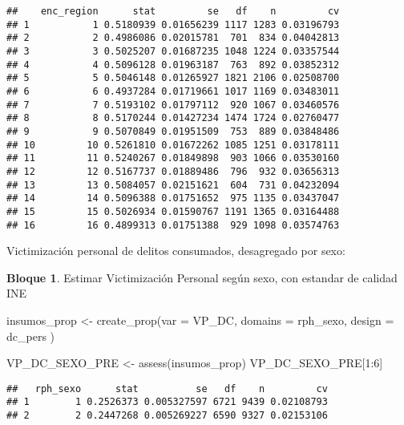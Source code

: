\documentclass[
]{book}
\newenvironment{Shaded}{\begin{snugshade}}{\end{snugshade}}
\newcommand{\AttributeTok}[1]{\textcolor[rgb]{0.77,0.63,0.00}{#1}}
\newcommand{\DecValTok}[1]{\textcolor[rgb]{0.00,0.00,0.81}{#1}}
\newcommand{\FunctionTok}[1]{\textcolor[rgb]{0.00,0.00,0.00}{#1}}
\newcommand{\NormalTok}[1]{#1}
\newcommand{\OtherTok}[1]{\textcolor[rgb]{0.56,0.35,0.01}{#1}}
\newcommand{\SpecialCharTok}[1]{\textcolor[rgb]{0.00,0.00,0.00}{#1}}
\newcommand{\StringTok}[1]{\textcolor[rgb]{0.31,0.60,0.02}{#1}}
\theoremstyle{definition}
\theoremstyle{definition}
\newtheorem{example}{Bloque}[chapter]
\theoremstyle{definition}
\theoremstyle{definition}
\theoremstyle{remark}
\begin{document}
\begin{verbatim}
##    enc_region      stat         se   df    n         cv
## 1           1 0.5180939 0.01656239 1117 1283 0.03196793
## 2           2 0.4986086 0.02015781  701  834 0.04042813
## 3           3 0.5025207 0.01687235 1048 1224 0.03357544
## 4           4 0.5096128 0.01963187  763  892 0.03852312
## 5           5 0.5046148 0.01265927 1821 2106 0.02508700
## 6           6 0.4937284 0.01719661 1017 1169 0.03483011
## 7           7 0.5193102 0.01797112  920 1067 0.03460576
## 8           8 0.5170244 0.01427234 1474 1724 0.02760477
## 9           9 0.5070849 0.01951509  753  889 0.03848486
## 10         10 0.5261810 0.01672262 1085 1251 0.03178111
## 11         11 0.5240267 0.01849898  903 1066 0.03530160
## 12         12 0.5167737 0.01889486  796  932 0.03656313
## 13         13 0.5084057 0.02151621  604  731 0.04232094
## 14         14 0.5096388 0.01751652  975 1135 0.03437047
## 15         15 0.5026934 0.01590767 1191 1365 0.03164488
## 16         16 0.4899313 0.01751388  929 1098 0.03574763
\end{verbatim}

Victimización personal de delitos consumados, desagregado por sexo:

\begin{example}
\protect\hypertarget{exm:bloque11nbm}{}\label{exm:bloque11nbm}Estimar Victimización Personal según sexo, con estandar de calidad INE
\end{example}

\begin{Shaded}
\begin{Highlighting}[]
\NormalTok{insumos\_prop }\OtherTok{\textless{}{-}} \FunctionTok{create\_prop}\NormalTok{(}\AttributeTok{var =} \StringTok{\textquotesingle{}VP\_DC\textquotesingle{}}\NormalTok{, }
                                   \AttributeTok{domains =} \StringTok{\textquotesingle{}rph\_sexo\textquotesingle{}}\NormalTok{, }
                                   \AttributeTok{design =}\NormalTok{  dc\_pers}
\NormalTok{                                )}

\NormalTok{VP\_DC\_SEXO\_PRE }\OtherTok{\textless{}{-}} \FunctionTok{assess}\NormalTok{(insumos\_prop)}
\NormalTok{VP\_DC\_SEXO\_PRE[}\DecValTok{1}\SpecialCharTok{:}\DecValTok{6}\NormalTok{]}
\end{Highlighting}
\end{Shaded}

\begin{verbatim}
##   rph_sexo      stat          se   df    n         cv
## 1        1 0.2526373 0.005327597 6721 9439 0.02108793
## 2        2 0.2447268 0.005269227 6590 9327 0.02153106
\end{verbatim}
\end{document}
